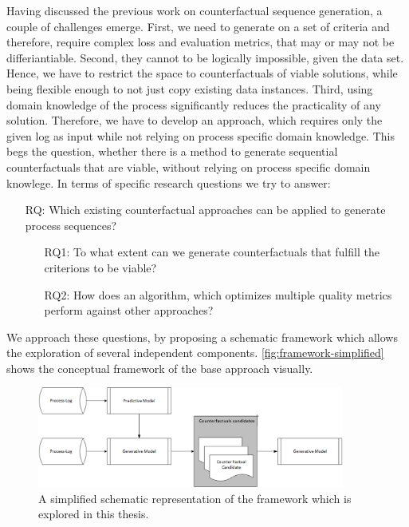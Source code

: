 \documentclass[./../../paper.tex]{subfiles}
\begin{document}
Having discussed the previous work on counterfactual sequence generation, a couple of challenges emerge. 
First, we need to generate on a set of criteria and therefore, require complex loss and evaluation metrics, that may or may not be differiantiable. Second, they cannot to be logically impossible, given the data set. 
Hence, we have to restrict the space to counterfactuals of viable solutions, while being flexible enough to not just copy existing data instances. 
Third, using domain knowledge of the process significantly reduces the practicality of any solution. Therefore, we have to develop an approach, which requires only the given log as input while not relying on process specific domain knowledge. This begs the question, whether there is a method to generate sequential counterfactuals that are viable, without relying on process specific domain knowlege. In terms of specific research questions we try to answer:

\begin{itemize}
    \item[RQ:] Which existing counterfactual approaches can be applied to generate process sequences?
    \begin{itemize}
        \item[RQ1:] To what extent can we generate counterfactuals that fulfill the criterions to be viable?
        \item[RQ2:] How does an algorithm, which optimizes multiple quality metrics perform against other approaches?  
    \end{itemize}
\end{itemize}

\noindent We approach these questions, by proposing a schematic framework which allows the exploration of several independent components. \autoref{fig:framework-simplified} shows the conceptual framework of the base approach visually.

\begin{figure}[htb]
    \centering
    \includegraphics[width=0.9\textwidth]{figures/framework_simplified.png}
    \caption{A simplified schematic representation of the framework which is explored in this thesis.}
    \label{fig:framework-simplified}
\end{figure}
\end{document}
